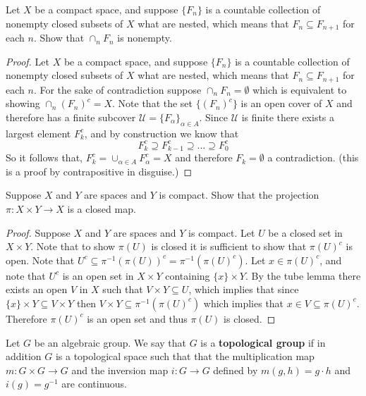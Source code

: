 \documentclass{homework651}
\def\ra{\rightarrow}
\begin{document}
\begin{problems}
 Let $X$ be a compact space, and suppose $\{F_n\}$
is a countable collection of nonempty closed subsets of $X$ what are nested, which means that $F_n \subseteq F_{n+1}$
for each $n$. Show that $\cap_nF_n$ is nonempty. 

\begin{proof}Let $X$ be a compact space, and suppose $\{F_n\}$
    is a countable collection of nonempty closed subsets of $X$ what are nested, which means that $F_n \subseteq F_{n+1}$
    for each $n$. For the sake of contradiction suppose $\cap_nF_n = \emptyset$ which is equivalent to showing $\cap_n(F_n)^c = X$. Note that the set $\{(F_n)^c\}$
    is an open cover of $X$ and therefore has a finite subcover $\mathcal{U} = \{F_\alpha\}_{\alpha \in A}$. Since $\mathcal{U}$ is finite there exists a largest element $F_k^c$, and by construction we know that
    \begin{equation*}
        F_k^c \supseteq F_{k - 1}^c \supseteq ... \supseteq F_{0}^c
    \end{equation*}  
    So it follows that, $F_k^c =  \cup_{\alpha \in A} F_\alpha^c = X$ and therefore $F_k = \emptyset$ a contradiction.
    (this is a proof by contrapositive in disguise.) 

\end{proof}








\problem Suppose $X$ and $Y$ are spaces and $Y$ is compact.
Show that the projection $\pi: X\times Y \to X$ is a closed map.
\begin{proof} Suppose $X$ and $Y$ are spaces and $Y$ is compact. Let $U$ be a closed set in $X \times Y$. Note that to show $\pi(U)$ is closed it is 
    sufficient to show that $\pi(U)^c$ is open. Note that $U^c \subseteq \pi^{-1}(\pi(U))^c = \pi^{-1}(\pi(U)^c)$. Let $x \in \pi(U)^c$, and note that $U^c$
    is an open set in $X \times Y$ containing $\{x\}\times Y$. By the tube lemma there exists an open $V$ in $X$ such that $V \times Y \subseteq U$, which implies 
    that since $\{x\} \times Y \subseteq V \times Y$ then $V \times Y \subseteq \pi^{-1}(\pi(U)^c)$ which implies that $x \in V \subseteq \pi(U)^c$. Therefore $\pi(U)^c$ is an open set and thus $\pi(U)$ is closed. 
\end{proof}





\problem Let $G$ be an algebraic group.  We say that $G$ is a {\bf topological group}
if in addition $G$ is a topological space
such that that the multiplication
map $m:G\times G\ra G$ and the inversion map $i:G\ra G$ defined by $m(g,h)=g\cdot h$ and $i(g)=g^{-1}$
are continuous.




\end{problems}
\end{document}
